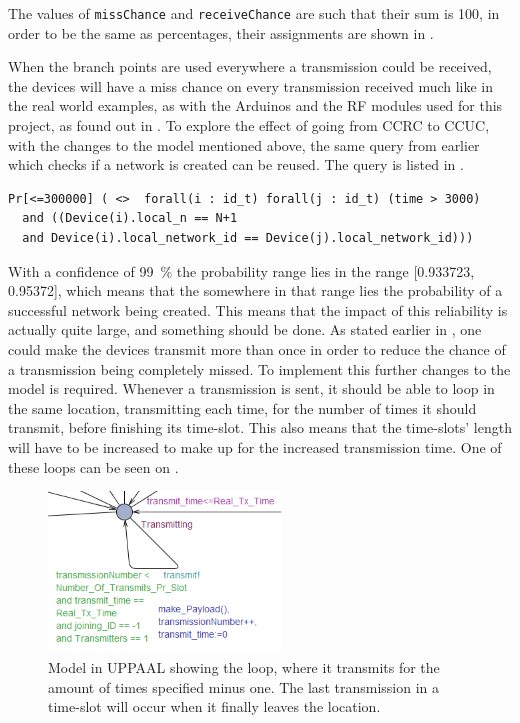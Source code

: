 \noindent
The values of \texttt{missChance} and \texttt{receiveChance} are such that their sum is 100, in order to be the same as percentages, their assignments are shown in .

When the branch points are used everywhere a transmission could be received, the devices will have a miss chance on every transmission received much like in the real world examples, as with the Arduinos and the RF modules used for this project, as found out in .
To explore the effect of going from CCRC to CCUC, with the changes to the model mentioned above, the same query from earlier which checks if a network is created can be reused. 
The query is listed in .

\begin{lstlisting}[style=UPPAAL, caption={Query for UPPAAL which asks for the probability of all devices in a network being equal to the number of devices in the system, and that they all have the same \texttt{network\_id}}, label={query-SuccesfulCreate}]
Pr[<=300000] ( <>  forall(i : id_t) forall(j : id_t) (time > 3000) 
  and ((Device(i).local_n == N+1 
  and Device(i).local_network_id == Device(j).local_network_id)))
\end{lstlisting}

\noindent
With a confidence of 99~\% the probability range lies in the range [0.933723, 0.95372], which means that the somewhere in that range lies the probability of a successful network being created.
This means that the impact of this reliability is actually quite large, and something should be done.
As stated earlier in , one could make the devices transmit more than once in order to reduce the chance of a transmission being completely missed.
To implement this further changes to the model is required.
Whenever a transmission is sent, it should be able to loop in the same location, transmitting each time, for the number of times it should transmit, before finishing its time-slot. 
This also means that the time-slots' length will have to be increased to make up for the increased transmission time.
One of these loops can be seen on .

\begin{figure}
\vspace{12pt}
\centering
  \includegraphics[width=0.55\textwidth]{Figures/Model/Transmit_Loop.png} 
\caption{Model in UPPAAL showing the loop, where it transmits for the amount of times specified minus one. The last transmission in a time-slot will occur when it finally leaves the location.}
\label{LoopTransmitUPPAAL}
\end{figure}

